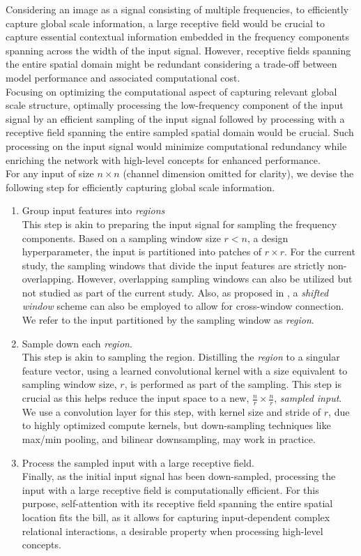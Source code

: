 \documentclass{article}
\begin{document}
Considering an image as a signal consisting of multiple frequencies, to efficiently capture global scale information, a large receptive field would be crucial to capture essential contextual information embedded in the frequency components spanning across the width of the input signal. However, receptive fields spanning the entire spatial domain might be redundant considering a trade-off between model performance and associated computational cost. \\
\indent Focusing on optimizing the computational aspect of capturing relevant global scale structure, optimally processing the low-frequency component of the input signal by an efficient sampling of the input signal followed by processing with a receptive field spanning the entire sampled spatial domain would be crucial. Such processing on the input signal would minimize computational redundancy while enriching the network with high-level concepts for enhanced performance. \\
For any input of size $n \times n$ (channel dimension omitted for clarity), we devise the following step for efficiently capturing global scale information. \label{steps:mixr}
\begin{enumerate}
    \item Group input features into \textit{regions} \\
    This step is akin to preparing the input signal for sampling the frequency components. Based on a sampling window size $r < n$, a design hyperparameter, the input is partitioned into patches of $r \times r$. For the current study, the sampling windows that divide the input features are strictly non-overlapping. However, overlapping sampling windows can also be utilized but not studied as part of the current study. Also, as proposed in \cite{DBLP:journals/corr/Swin}, a \textit{shifted window} scheme can also be employed to allow for cross-window connection. We refer to the input partitioned by the sampling window as \textit{region}.
    \item Sample down each \textit{region}. \\
    This step is akin to sampling the region. Distilling the \textit{region} to a singular feature vector, using a learned convolutional kernel with a size equivalent to sampling window size, $r$, is performed as part of the sampling. This step is crucial as this helps reduce the input space to a new, $\frac{n}{r} \times \frac{n}{r}$, \textit{sampled input}. We use a convolution layer for this step, with kernel size and stride of $r$, due to highly optimized compute kernels, but down-sampling techniques like max/min pooling, and bilinear downsampling, may work in practice.
    \item \label{step:3} Process the sampled input with a large receptive field. \\
    Finally, as the initial input signal has been down-sampled, processing the input with a large receptive field is computationally efficient. For this purpose, self-attention with its receptive field spanning the entire spatial location fits the bill, as it allows for capturing input-dependent complex relational interactions, a desirable property when processing high-level concepts. 
\end{enumerate}
\end{document}
